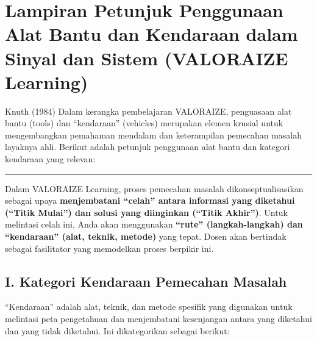 \documentclass[
  letterpaper,
  DIV=11,
  numbers=noendperiod]{scrreprt}
\begin{document}

\chapter{Lampiran Petunjuk Penggunaan Alat Bantu dan Kendaraan dalam
Sinyal dan Sistem (VALORAIZE
Learning)}\label{lampiran-petunjuk-penggunaan-alat-bantu-dan-kendaraan-dalam-sinyal-dan-sistem-valoraize-learning}

Knuth (1984) Dalam kerangka pembelajaran VALORAIZE, penguasaan alat
bantu (tools) dan ``kendaraan'' (vehicles) merupakan elemen krusial
untuk mengembangkan pemahaman mendalam dan keterampilan pemecahan
masalah layaknya ahli. Berikut adalah petunjuk penggunaan alat bantu dan
kategori kendaraan yang relevan:

\begin{center}\rule{0.5\linewidth}{0.5pt}\end{center}

Dalam VALORAIZE Learning, proses pemecahan masalah dikonseptualisasikan
sebagai upaya \textbf{menjembatani ``celah'' antara informasi yang
diketahui (``Titik Mulai'') dan solusi yang diinginkan (``Titik
Akhir'')}. Untuk melintasi celah ini, Anda akan menggunakan
\textbf{``rute'' (langkah-langkah) dan ``kendaraan'' (alat, teknik,
metode)} yang tepat. Dosen akan bertindak sebagai fasilitator yang
memodelkan proses berpikir ini.

\section{\texorpdfstring{\textbf{I. Kategori Kendaraan Pemecahan
Masalah}}{I. Kategori Kendaraan Pemecahan Masalah}}\label{i.-kategori-kendaraan-pemecahan-masalah}

``Kendaraan'' adalah alat, teknik, dan metode spesifik yang digunakan
untuk melintasi peta pengetahuan dan menjembatani kesenjangan antara
yang diketahui dan yang tidak diketahui. Ini dikategorikan sebagai
berikut:
\end{document}
